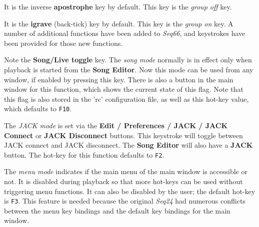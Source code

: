 
   It is the inverse \textbf{apostrophe} key by default.
   This key is the \textsl{group off} key.

   It is the \textbf{igrave} (back-tick) key by default.
   This key is the \textsl{group on} key.
   A number of additional functions have been added to \textsl{Seq66},
   and keystrokes have been provided for those new functions.

   \setcounter{ItemCounter}{0}      %

   Note the \textbf{Song/Live toggle} key.
   The \textsl{song mode} normally is in effect only when playback is started
   from the \textbf{Song Editor}.  Now this mode can be used from any
   window, if enabled by pressing this key.  There is also
   a button in the main window for this function, which shows the current state
   of this flag.  Note that this flag is also stored in the 'rc' configuration
   file, as well as this hot-key value, which defaults to \texttt{F10}.

   The \textsl{JACK mode} is set via the
   \textbf{Edit / Preferences / JACK / JACK Connect} or 
   \textbf{JACK Disconnect} buttons.
   This keystroke will toggle between JACK connect and JACK disconnect.
   The \textbf{Song Editor} will also have a \textbf{JACK} button.
   The hot-key for this function defaults to \texttt{F2}.

   The \textsl{menu mode} indicates if the main menu of the
   main window is accessible or not.  It is disabled during playback
   so that more hot-keys can be used without triggering menu functions.
   It can also be disabled by the user; the default hot-key is \texttt{F3}.
   This feature is needed because the original \textsl{Seq24} had numerous
   conflicts between the menu key bindings and the default key bindings for the
   main window.

